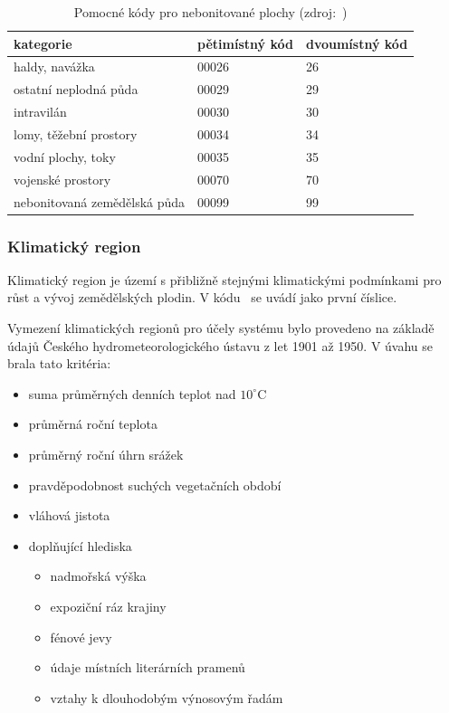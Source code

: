 \begin{table}[H]
    \begin{tabular}{|l|l|l|}
        \hline
         kategorie & pětimístný kód & dvoumístný kód \\
        \hline
        \hline
         haldy, navážka              	& 00026	& 26 \\ \hline
         ostatní neplodná půda			& 00029	& 29 \\ \hline
         intravilán                   	& 00030	& 30 \\ \hline
         lomy, těžební prostory       	& 00034	& 34 \\ \hline
         vodní plochy, toky           	& 00035	& 35 \\ \hline
         vojenské prostory				& 00070	& 70 \\ \hline
         nebonitovaná zemědělská půda	& 00099	& 99 \\
         \hline
    \end{tabular}
    \centering
    \caption[Pomocné kódy pro nebonitované plochy]{Pomocné kódy pro nebonitované plochy (zdroj:~\citep{metodika_bpej})}
    \label{tab:pomocne_kody_bpej}
\end{table}

\subsubsection{Klimatický region}
\label{klimaticky_region}

Klimatický region je území s přibližně stejnými klimatickými podmínkami pro růst a vývoj zemědělských plodin. V kódu~ se uvádí jako první číslice.

Vymezení klimatických regionů pro účely systému  bylo provedeno na základě údajů Českého hydrometeorologického ústavu z let 1901 až 1950. V úvahu se brala tato kritéria:
	\begin{itemize}[leftmargin=1.5cm, noitemsep]
		\item suma průměrných denních teplot nad $10^\circ$C
		\item průměrná roční teplota
		\item průměrný roční úhrn srážek
		\item pravděpodobnost suchých vegetačních období
		\item vláhová jistota
		\item doplňující hlediska
			\begin{itemize}[leftmargin=1cm, noitemsep]
				\item nadmořská výška
				\item expoziční ráz krajiny
				\item fénové jevy
				\item údaje místních literárních pramenů
				\item vztahy k dlouhodobým výnosovým řadám
			\end{itemize}
	\end{itemize}

